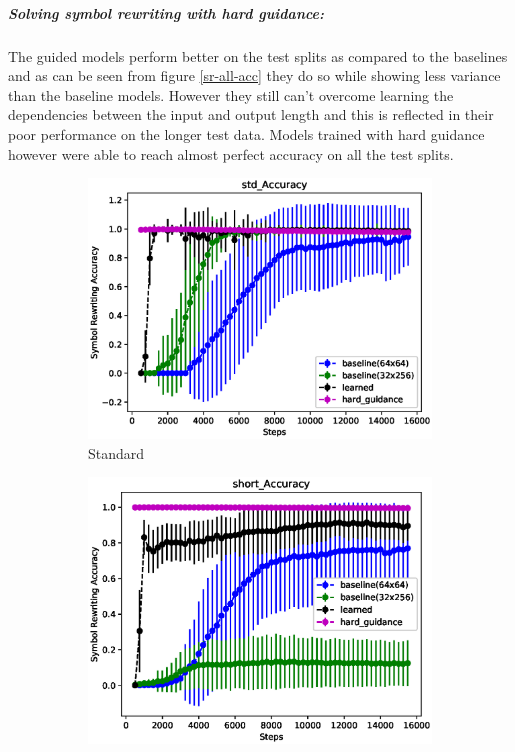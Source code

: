\subparagraph{Solving symbol rewriting with hard guidance:} The guided models perform better on the test splits as compared to the baselines and as can be seen from figure \ref{sr-all-acc} they do so while showing less variance than the baseline models. However they still can't overcome learning the dependencies between the input and output length and this is reflected in their poor performance on the longer test data. Models trained with hard guidance however were able to reach almost perfect accuracy on all the test splits.

\begin{figure}[H]
	\begin{subfigure}{0.5\linewidth}
		\includegraphics[width=0.95\linewidth]{./figs/sr/std-acc-eps}
		\caption{Standard}\label{std-acc}
	\end{subfigure}
	\begin{subfigure}{0.5\linewidth}
		\includegraphics[width=0.95\linewidth]{./figs/sr/short-acc-eps}

\end{subfigure}
\end{figure}
